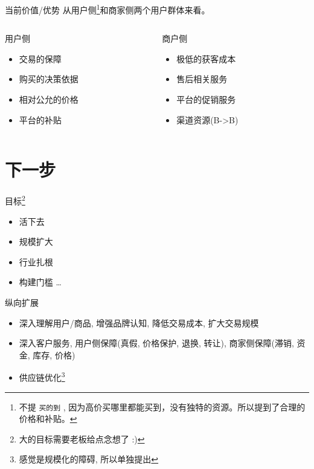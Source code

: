 \documentclass[presentation,bigger]{beamer}
\begin{document}
\begin{frame}[fragile,label={sec:org345d86f}]{当前价值/优势}
 从用户侧\footnote{不提 \texttt{买的到} , 因为高价买哪里都能买到，没有独特的资源。所以提到了合理的价格和补贴。}和商家侧两个用户群体来看。

\begin{columns}
\begin{column}{0.45\columnwidth}
\begin{exampleblock}{用户侧}
\begin{itemize}
\item 交易的保障
\item 购买的决策依据
\item 相对公允的价格
\item 平台的补贴
\end{itemize}
\end{exampleblock}
\end{column}

\begin{column}{0.45\columnwidth}
\begin{exampleblock}{商户侧}
\begin{itemize}
\item 极低的获客成本
\item 售后相关服务
\item 平台的促销服务
\item 渠道资源(B->B)
\end{itemize}
\end{exampleblock}
\end{column}
\end{columns}

\end{frame}

\section{下一步}
\label{sec:org30af355}

\begin{frame}[label={sec:org64277bc}]{目标\footnote{大的目标需要老板给点念想了 :)}}
\begin{itemize}
\item 活下去
\item 规模扩大
\item 行业扎根
\item 构建门槛 \dots{}
\end{itemize}
\end{frame}

\begin{frame}[label={sec:org1660f6d}]{纵向扩展}
\begin{itemize}
\item 深入理解用户/商品, 增强品牌认知, 降低交易成本, 扩大交易规模
\item 深入客户服务, 用户侧保障(真假, 价格保护, 退换, 转让), 商家侧保障(滞销, 资金, 库存, 价格)
\item 供应链优化\footnote{感觉是规模化的障碍, 所以单独提出}
\end{itemize}
\end{frame}
\end{document}
